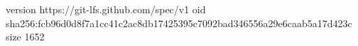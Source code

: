 version https://git-lfs.github.com/spec/v1
oid sha256:fcb96d0d8f7a1cc41c2ac8db17425395c7092bad346556a29e6caab5a17d423c
size 1652
